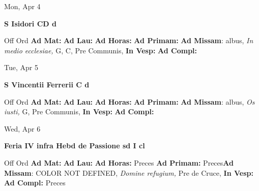 \documentclass[10pt]{memoir}
\begin{document}
\begin{center}
\begin{minipage}{3.5in}
\vspace{2em}
\begin{center}Mon, Apr 4
\end{center}
\textbf{ \large S Isidori CD
\textnormal{\normalsize d}}

\begin{justify}Off Ord
\textbf{Ad Mat: }
\textbf{Ad Lau: }
\textbf{Ad Horas: }
\textbf{Ad Primam: }\textbf{Ad Missam}: albus, \textit{In medio ecclesiae,} G, C, Pre Communis, 
\textbf{In Vesp: }
\textbf{Ad Compl: }
\end{justify}
\end{minipage}
\end{center}

\begin{center}
\begin{minipage}{3.5in}
\vspace{2em}
\begin{center}Tue, Apr 5
\end{center}
\textbf{ \large S Vincentii Ferrerii C
\textnormal{\normalsize d}}

\begin{justify}Off Ord
\textbf{Ad Mat: }
\textbf{Ad Lau: }
\textbf{Ad Horas: }
\textbf{Ad Primam: }\textbf{Ad Missam}: albus, \textit{Os iusti,} G, Pre Communis, 
\textbf{In Vesp: }
\textbf{Ad Compl: }
\end{justify}
\end{minipage}
\end{center}

\begin{center}
\begin{minipage}{3.5in}
\vspace{2em}
\begin{center}Wed, Apr 6
\end{center}
\textbf{ \large Feria IV infra Hebd de Passione
\textnormal{\normalsize sd I cl}}

\begin{justify}Off Ord
\textbf{Ad Mat: }
\textbf{Ad Lau: }
\textbf{Ad Horas: }Preces
\textbf{Ad Primam: }Preces\textbf{Ad Missam}: COLOR NOT DEFINED, \textit{Domine refugium,} Pre de Cruce, 
\textbf{In Vesp: }
\textbf{Ad Compl: }Preces
\end{justify}
\end{minipage}
\end{center}
\end{document}
